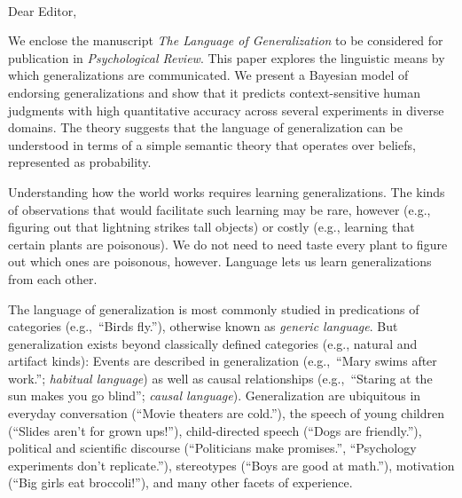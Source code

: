 \documentclass[11pt,letterpaper]{letter} %
\def\opening#1{\thispagestyle{empty}
{\centering\fromaddress \vspace{0.6in} \\ %
\hspace*{\longindentation}\hspace*{\fill}\par} %
\vspace{0.4in} %
\noindent #1 %
}
\begin{document}
\begin{letter}

\opening{Dear Editor,}

We enclose the manuscript \emph{The Language of Generalization} to be considered for publication in \emph{Psychological Review}. 
This paper explores the linguistic means by which generalizations are communicated.  
We present a Bayesian model of endorsing generalizations and show that it predicts context-sensitive human judgments with high quantitative accuracy across several experiments in diverse domains.
The theory suggests that the language of generalization can be understood in terms of a simple semantic theory that operates over beliefs, represented as probability.

Understanding how the world works requires learning generalizations. 
The kinds of observations that would facilitate such learning may be rare, however (e.g., figuring out that lightning strikes tall objects) or costly (e.g., learning that certain plants are poisonous).
We do not need to need taste every plant to figure out which ones are poisonous, however.
Language lets us learn generalizations from each other.

The language of generalization is most commonly studied in predications of categories (e.g.,~``Birds fly.''), otherwise known as \emph{generic language}.
But generalization exists beyond classically defined categories (e.g., natural and artifact kinds): Events are described in generalization (e.g.,~``Mary swims after work.''; \emph{habitual language}) as well as causal relationships (e.g.,~``Staring at the sun makes you go blind''; \emph{causal language}).
Generalization are ubiquitous in everyday conversation (``Movie theaters are cold.''), the speech of young children (``Slides aren't for grown ups!''), child-directed speech (``Dogs are friendly.''), political and scientific discourse (``Politicians make promises.'', ``Psychology experiments don't replicate.''), stereotypes (``Boys are good at math.''), motivation (``Big girls eat broccoli!''), and many other facets of experience.



\end{letter}
\end{document}
